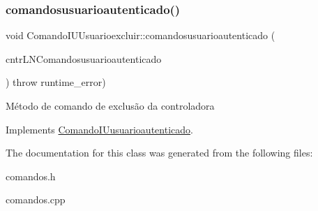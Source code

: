\subsubsection{\texorpdfstring{comandosusuarioautenticado()}{comandosusuarioautenticado()}}
{\footnotesize\ttfamily void Comando\+I\+U\+Usuarioexcluir\+::comandosusuarioautenticado (\begin{DoxyParamCaption}\item[{\hyperlink{classILNComandosusuarioautenticado}{I\+L\+N\+Comandosusuarioautenticado} $\ast$}]{cntr\+L\+N\+Comandosusuarioautenticado }\end{DoxyParamCaption}) throw  runtime\+\_\+error) \hspace{0.3cm}{\ttfamily [virtual]}}

Método de comando de exclusão da controladora 

Implements \hyperlink{classComandoIUusuarioautenticado}{Comando\+I\+Uusuarioautenticado}.



The documentation for this class was generated from the following files\+:\begin{DoxyCompactItemize}
\item 
comandos.\+h\item 
comandos.\+cpp\end{DoxyCompactItemize}
